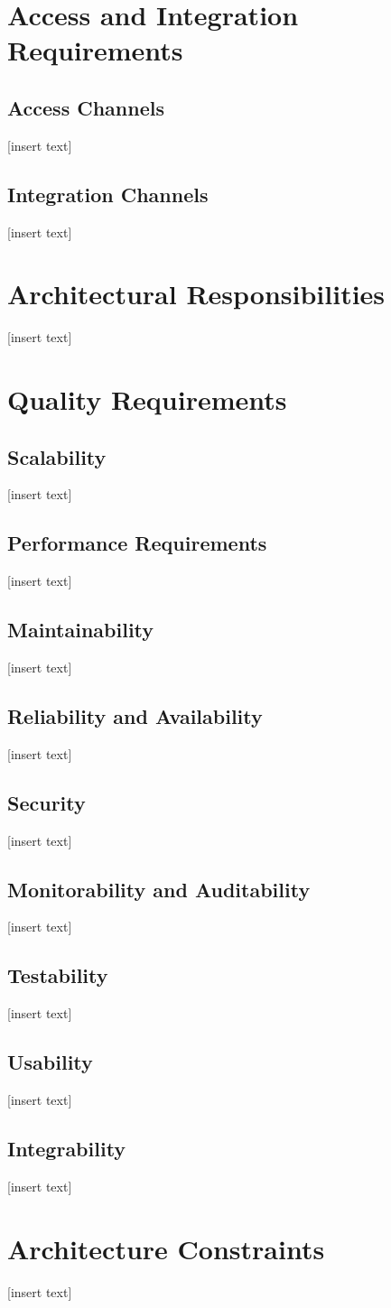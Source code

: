 \documentclass[11pt]{article}
\begin{document}


\tableofcontents	%
\newpage

\section{Access and Integration Requirements}
	\subsection{Access Channels}
		[insert text]
	\subsection{Integration Channels}
	[insert text]
\section{Architectural Responsibilities}
	[insert text]
\section{Quality Requirements}
	\subsection{Scalability}
		[insert text]
	\subsection{Performance Requirements}
		[insert text]
	\subsection{Maintainability}
		[insert text]
	\subsection{Reliability and Availability}
		[insert text]
	\subsection{Security}
		[insert text]
	\subsection{Monitorability and Auditability}
		[insert text]
	\subsection{Testability }
		[insert text]
	\subsection{Usability }
		[insert text]
	\subsection{Integrability}
		[insert text]
\section{Architecture Constraints}
	[insert text]
\end{document}
